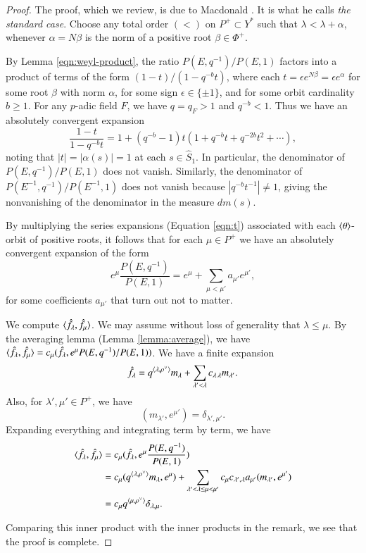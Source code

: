 \begin{proof}  
The proof, which we review, is due to Macdonald \cite[Ch.V]{macdonaldspherical}.
It is what he calls {\it the standard case}.  
Choose any total order $(<)$ on $P^+\subset Y^*$ such that 
$\lambda < \lambda + \alpha$, whenever $\alpha = N\beta$ is the norm of a positive root $\beta\in\Phi^+$.

By Lemma \ref{eqn:weyl-product},
the ratio $P(E,q^{-1})/P(E,1)$  factors into a product of terms of the form $(1- t)/(1- q^{-b} t)$, 
where each $t = \epsilon e^{N\beta} = \epsilon e^\alpha$ for
some root $\beta$ with norm $\alpha$, 
for some sign $\epsilon\in \{\pm 1\}$, and for some orbit cardinality $b\ge 1$.
For any $p$-adic field $F$, we have $q = q_F > 1$ and $q^{-b} < 1$.  Thus we have an absolutely convergent 
expansion
\begin{equation}\label{eqn:t}
\frac{1- t}{1- q^{-b} t} = 1 + (q^{-b}-1) t (1+ q^{-b} t + q^{-2b} t^2 + \cdots),
\end{equation}
noting that $|t| = |\alpha(s)|=1$ at each $s\in \hat S_1$.  In particular, the denominator of $P(E,q^{-1})/P(E,1)$ does not
vanish.  Similarly, the
denominator of $P(E^{-1},q^{-1})/P(E^{-1},1)$ does not vanish because $|q^{-b} t^{-1}|\ne1$, giving the nonvanishing of the
denominator in the measure $dm(s)$.

By multiplying the series expansions (Equation \ref{eqn:t}) associated with each $\langle{\theta}\rangle$-orbit of positive roots,
it follows that for each $\mu\in P^+$ we have an absolutely convergent expansion of the form
\[
e^\mu \frac{P(E,q^{-1})}{P(E,1)} = e^\mu +\sum_{\mu< \mu'} a_{\mu'} e^{\mu'},
\] 
for some coefficients $a_{\mu'}$ that turn out not to matter.

We compute $\langle{\hat f_\lambda,\hat f_\mu}\rangle$.
We may assume without loss of generality that $\lambda \le \mu$.
By the averaging lemma (Lemma \ref{lemma:average}),
we have $\langle{\hat f_\lambda,\hat f_\mu}\rangle = c_\mu (\hat f_\lambda,e^\mu P(E,q^{-1})/P(E,1))$.
We have a finite expansion
\[
\hat f_\lambda = q^{\langle{\lambda,\rho^\vee}\rangle} m_\lambda + \sum_{\lambda' <\lambda } c_{\lambda\,\lambda} m_{\lambda'}.
\]
Also, for $\lambda',\mu'\in P^+$, we have
\[
(m_{\lambda'},e^{\mu'}) = \delta_{\lambda',{\mu'}}.
\]
Expanding everything and integrating term by term, we have
\begin{align*}
\langle{\hat f_\lambda,\hat f_\mu}\rangle &= c_\mu (\hat f_\lambda, e^\mu \frac{ P(E,q^{-1})}{P(E,1)})\\
&= c_\mu (q^{\langle{\lambda,\rho^\vee}\rangle} m_\lambda,e^\mu) + \sum_{\lambda' < \lambda\le\mu < \mu'}
c_\mu c_{\lambda',\lambda} a_{\mu'} (m_{\lambda'},e^{\mu'})\\ 
&= c_\mu q^{\langle{\mu,\rho^\vee}\rangle} \delta_{\lambda,\mu}.
\end{align*}

Comparing this inner product with the  inner products in the remark, we see that the proof is 
complete.
\end{proof}



